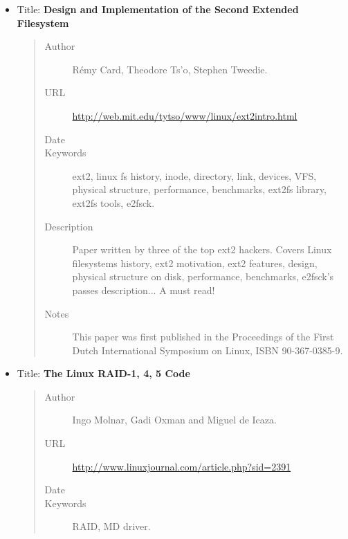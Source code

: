 \documentclass[a4paper,8pt,english]{sphinxmanual}
\begin{document}
\begin{itemize}
\begin{quote}
\begin{description}
\end{description}\end{quote}

\item {} 
Title: \textbf{Design and Implementation of the Second Extended Filesystem}
\begin{quote}\begin{description}
\item[{Author}] \leavevmode
Rémy Card, Theodore Ts'o, Stephen Tweedie.

\item[{URL}] \leavevmode
\href{http://web.mit.edu/tytso/www/linux/ext2intro.html}{http://web.mit.edu/tytso/www/linux/ext2intro.html}

\item[{Date}] 

\item[{Keywords}] \leavevmode
ext2, linux fs history, inode, directory, link, devices,
VFS, physical structure, performance, benchmarks, ext2fs library,
ext2fs tools, e2fsck.

\item[{Description}] \leavevmode
Paper written by three of the top ext2 hackers.
Covers Linux filesystems history, ext2 motivation, ext2 features,
design, physical structure on disk, performance, benchmarks,
e2fsck's passes description... A must read!

\item[{Notes}] \leavevmode
This paper was first published in the Proceedings of the
First Dutch International Symposium on Linux, ISBN 90-367-0385-9.

\end{description}\end{quote}

\item {} 
Title: \textbf{The Linux RAID-1, 4, 5 Code}
\begin{quote}\begin{description}
\item[{Author}] \leavevmode
Ingo Molnar, Gadi Oxman and Miguel de Icaza.

\item[{URL}] \leavevmode
\href{http://www.linuxjournal.com/article.php?sid=2391}{http://www.linuxjournal.com/article.php?sid=2391}

\item[{Date}] 

\item[{Keywords}] \leavevmode
RAID, MD driver.


\end{description}
\end{quote}
\end{itemize}
\end{document}
